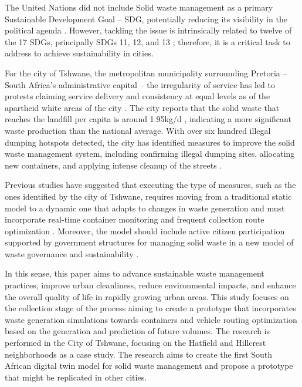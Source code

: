 \documentclass[authoryear,preprint,review,12pt]{elsarticle}
\begin{document}
    The United Nations did not include Solid waste management as a primary Sustainable Development Goal – SDG, potentially reducing its visibility in the political agenda \citep{rodicResolvingGovernanceIssues2017}. However, tackling the issue is intrinsically related to twelve of the 17 SDGs, principally SDGs 11, 12, and 13 \citep{Wilson2015}; therefore, it is a critical task to address to achieve sustainability in cities.

    For the city of Tshwane, the metropolitan municipality surrounding Pretoria – South Africa’s administrative capital – the irregularity of service has led to protests claiming service delivery and consistency at equal levels as of the apartheid white areas of the city \citep{Mokebe2018}. The city reports that the solid waste that reaches the landfill per capita is around 1.95kg/d \citep{tshwaneCityTshwane20222022}, indicating a more significant waste production than the national average. With over six hundred illegal dumping hotspots detected, the city has identified measures to improve the solid waste management system, including confirming illegal dumping sites, allocating new containers, and applying intense cleanup of the streets \citep{tshwaneConsolidatedAuditedAnnual2022}.

    Previous studies have suggested that executing the type of measures, such as the ones identified by the city of Tshwane, requires moving from a traditional static model to a dynamic one that adapts to changes in waste generation and must incorporate real-time container monitoring and frequent collection route optimization \citep{Anagnostopoulos2015a, Hina2020, Ramson2022}. Moreover, the model should include active citizen participation supported by government structures for managing solid waste in a new model of waste governance and sustainability \citep{kubanzaSustainableSolidWaste2020}.


    In this sense, this paper aims to advance sustainable waste management practices, improve urban cleanliness, reduce environmental impacts, and enhance the overall quality of life in rapidly growing urban areas. This study focuses on the collection stage of the process aiming to create a prototype that incorporates waste generation simulations towards containers and vehicle routing optimization based on the generation and prediction of future volumes. The research is performed in the City of Tshwane, focusing on the Hatfield and Hillcrest neighborhoods as a case study. The research aims to create the first South African digital twin model for solid waste management and propose a prototype that might be replicated in other cities.
\end{document}
